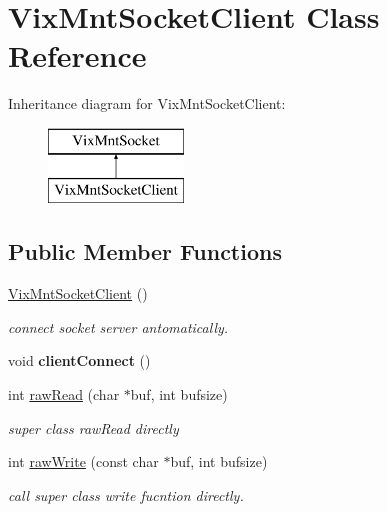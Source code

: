 \hypertarget{class_vix_mnt_socket_client}{}\section{Vix\+Mnt\+Socket\+Client Class Reference}
\label{class_vix_mnt_socket_client}
Inheritance diagram for Vix\+Mnt\+Socket\+Client\+:\begin{figure}[H]
\begin{center}
\leavevmode
\includegraphics[height=2.000000cm]{class_vix_mnt_socket_client}
\end{center}
\end{figure}
\subsection*{Public Member Functions}
\begin{DoxyCompactItemize}
\item 
\hypertarget{class_vix_mnt_socket_client_a58a5dad27ab2a744b42817488b3033d2}{}\label{class_vix_mnt_socket_client_a58a5dad27ab2a744b42817488b3033d2} 
\hyperlink{class_vix_mnt_socket_client_a58a5dad27ab2a744b42817488b3033d2}{Vix\+Mnt\+Socket\+Client} ()
\begin{DoxyCompactList}\small\item\em connect socket server antomatically. \end{DoxyCompactList}\item 
\hypertarget{class_vix_mnt_socket_client_a0a4838c5a818db5aaafd8a80448755b6}{}\label{class_vix_mnt_socket_client_a0a4838c5a818db5aaafd8a80448755b6} 
void {\bfseries client\+Connect} ()
\item 
int \hyperlink{class_vix_mnt_socket_client_a6fd660d4eae9b0a364404af9c9e3e5e4}{raw\+Read} (char $\ast$buf, int bufsize)
\begin{DoxyCompactList}\small\item\em super class raw\+Read directly \end{DoxyCompactList}\item 
int \hyperlink{class_vix_mnt_socket_client_a4c5cec6460e972d41308f21edada8b6b}{raw\+Write} (const char $\ast$buf, int bufsize)
\begin{DoxyCompactList}\small\item\em call super class write fucntion directly. \end{DoxyCompactList}\end{DoxyCompactItemize}

